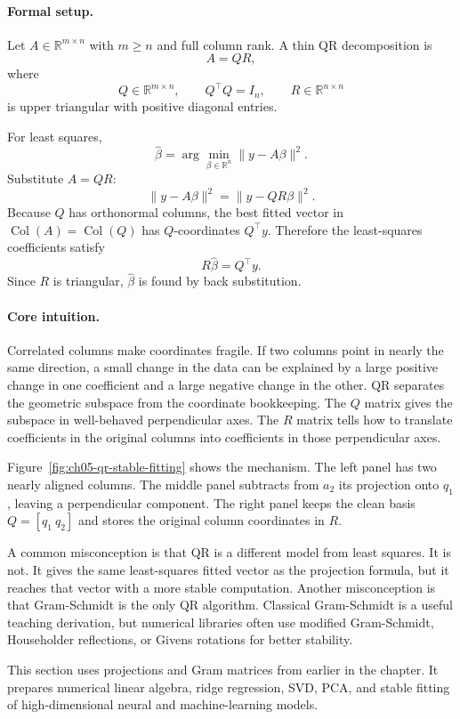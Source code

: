 \paragraph{Formal setup.}
Let \(A\in\mathbb{R}^{m\times n}\) with \(m\ge n\) and full column rank. A thin QR decomposition is
\[
A=QR,
\]
where
\[
Q\in\mathbb{R}^{m\times n},
\qquad
Q^\top Q=I_n,
\qquad
R\in\mathbb{R}^{n\times n}
\]
is upper triangular with positive diagonal entries.

For least squares,
\[
\hat\beta=\arg\min_{\beta\in\mathbb{R}^n}\|y-A\beta\|^2.
\]
Substitute \(A=QR\):
\[
\|y-A\beta\|^2=\|y-QR\beta\|^2.
\]
Because \(Q\) has orthonormal columns, the best fitted vector in \(\operatorname{Col}(A)=\operatorname{Col}(Q)\) has \(Q\)-coordinates \(Q^\top y\). Therefore the least-squares coefficients satisfy
\[
R\hat\beta=Q^\top y.
\]
Since \(R\) is triangular, \(\hat\beta\) is found by back substitution.

\paragraph{Core intuition.}
Correlated columns make coordinates fragile. If two columns point in nearly the same direction, a small change in the data can be explained by a large positive change in one coefficient and a large negative change in the other. QR separates the geometric subspace from the coordinate bookkeeping. The \(Q\) matrix gives the subspace in well-behaved perpendicular axes. The \(R\) matrix tells how to translate coefficients in the original columns into coefficients in those perpendicular axes.

Figure~\ref{fig:ch05-qr-stable-fitting} shows the mechanism. The left panel has two nearly aligned columns. The middle panel subtracts from \(a_2\) its projection onto \(q_1\), leaving a perpendicular component. The right panel keeps the clean basis \(Q=[q_1\ q_2]\) and stores the original column coordinates in \(R\).

A common misconception is that QR is a different model from least squares. It is not. It gives the same least-squares fitted vector as the projection formula, but it reaches that vector with a more stable computation. Another misconception is that Gram-Schmidt is the only QR algorithm. Classical Gram-Schmidt is a useful teaching derivation, but numerical libraries often use modified Gram-Schmidt, Householder reflections, or Givens rotations for better stability.

This section uses projections and Gram matrices from earlier in the chapter. It prepares numerical linear algebra, ridge regression, SVD, PCA, and stable fitting of high-dimensional neural and machine-learning models.

